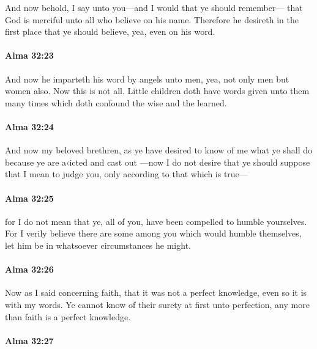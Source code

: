 			And now behold, I say unto you---and I would that ye should remember---
			that God is merciful unto all who believe on his name.
			Therefore he desireth in the first place
			that ye should believe, yea, even on his word.

		\paragraph{Alma 32:23} %
			\label{ALMA-32-23}

			And now he imparteth his word by angels unto men,
			yea, not only men but women also.
			Now this is not all.
			Little children doth have words given unto them many times
			which doth confound the wise and the learned.

		\paragraph{Alma 32:24} %
			\label{ALMA-32-24}

			And now my beloved brethren, as ye have desired to know of me
			what ye shall do because ye are a‹icted and cast out
			---now I do not desire that ye should suppose that I mean to judge you,
			only according to that which is true---

		\paragraph{Alma 32:25} %
			\label{ALMA-32-25}

			for I do not mean that ye, all of you, have been compelled to humble yourselves.
			For I verily believe there are some among you which would humble themselves,
			let him be in whatsoever circumstances he might.

		\paragraph{Alma 32:26} %
			\label{ALMA-32-26}

			Now as I said concerning faith, that it was not a perfect knowledge,
			even so it is with my words.
			Ye cannot know of their surety at first unto perfection,
			any more than faith is a perfect knowledge.

		\paragraph{Alma 32:27} %
			\label{ALMA-32-27}

